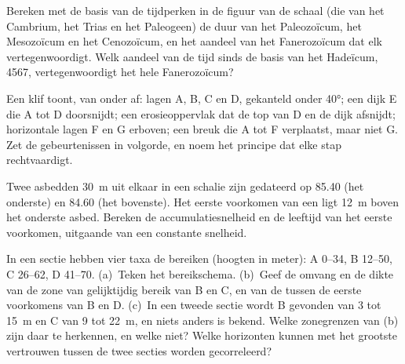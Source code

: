 \begin{exercise}[$\star$]\label{exo:b1:stratigraphic-scale:2}
Bereken met de basis van de tijdperken in de figuur van de schaal (die van het Cambrium, het Trias en het Paleogeen) de duur van het Paleozoïcum, het Mesozoïcum en het Cenozoïcum, en het aandeel van het Fanerozoïcum dat elk vertegenwoordigt. Welk aandeel van de tijd sinds de basis van het Hadeïcum, \qty{4567}{\Ma}, vertegenwoordigt het hele Fanerozoïcum?
\end{exercise}

\begin{exercise}[$\star$]\label{exo:b1:stratigraphic-scale:3}
Een klif toont, van onder af: lagen A, B, C en D, gekanteld onder \ang{40}; een dijk E die A tot D doorsnijdt; een erosieoppervlak dat de top van D en de dijk afsnijdt; horizontale lagen F en G erboven; een breuk die A tot F verplaatst, maar niet G. Zet de gebeurtenissen in volgorde, en noem het principe dat elke stap rechtvaardigt.
\end{exercise}

\begin{exercise}[$\star$]\label{exo:b1:stratigraphic-scale:4}
Twee asbedden \qty{30}{m} uit elkaar in een schalie zijn gedateerd op \qty{85.40}{\Ma} (het onderste) en \qty{84.60}{\Ma} (het bovenste). Het eerste voorkomen van een  ligt \qty{12}{m} boven het onderste asbed. Bereken de accumulatiesnelheid en de leeftijd van het eerste voorkomen, uitgaande van een constante snelheid.
\end{exercise}

\begin{exercise}[$\star\star$]\label{exo:b1:stratigraphic-scale:5}
In een sectie hebben vier taxa de bereiken (hoogten in meter): A 0--34, B 12--50, C 26--62, D 41--70. (a)~Teken het bereikschema. (b)~Geef de omvang en de dikte van de zone van gelijktijdig bereik van B en C, en van de  tussen de eerste voorkomens van B en D. (c)~In een tweede sectie wordt B gevonden van 3 tot 15~m en C van 9 tot 22~m, en niets anders is bekend. Welke zonegrenzen van (b) zijn daar te herkennen, en welke niet? Welke horizonten kunnen met het grootste vertrouwen tussen de twee secties worden gecorreleerd?
\end{exercise}

